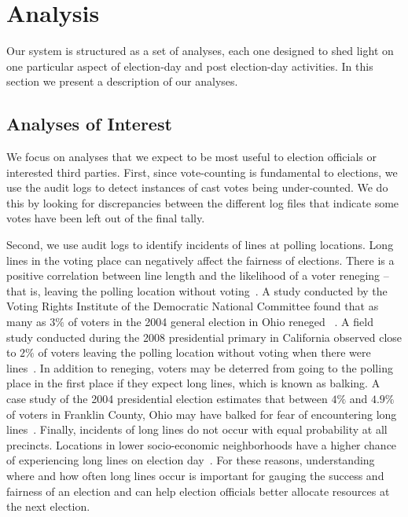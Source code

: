 \documentclass[letterpaper,twocolumn,10pt]{article}
\begin{document}
\section{Analysis}
Our system is structured as a set of analyses, each one designed to shed light
on one particular aspect of election-day and post election-day activities. In
this section we present a description of our analyses.

\subsection{Analyses of Interest}
We focus on analyses that we expect to be most useful to election officials or
interested third parties. First, since vote-counting is fundamental to
elections, we use the audit logs to detect instances of cast votes being
under-counted. We do this by looking for discrepancies between the
different log files that indicate some votes have been left out of the final
tally. 

Second, we use audit logs to identify incidents of lines at polling
locations. Long lines in the voting place can
negatively affect the fairness of elections. There is a positive correlation
between line length and the likelihood of a voter reneging -- that is, leaving
the polling location without voting~\cite{Spencer2010}. A study conducted by the
Voting Rights Institute of the Democratic National Committee found that as many
as $3\%$ of voters in the 2004 general election in Ohio reneged
~\cite{DNC2005}. A field study conducted 
during the 2008 presidential primary in California observed close to $2\%$
of voters leaving the polling location without voting when there were
lines~\cite{Spencer2010}. In addition to reneging, voters may be deterred from
going to the polling place in the first place if they expect long lines, which is
known as balking. A case study of the 2004 presidential election estimates that
between $4\%$ and $4.9\%$ of voters in Franklin County, Ohio may have balked for
fear of encountering long lines~\cite{Allen2006}. Finally, incidents of long
lines do not occur with equal probability at all precincts. Locations in lower
socio-economic neighborhoods have a higher chance of experiencing long lines on
election day~\cite{Spencer2010,DNC2005}. For these reasons, understanding where  
and how often long lines occur is important for gauging the success and fairness
of an election and can help election officials better allocate resources at the
next election. 
\end{document}
